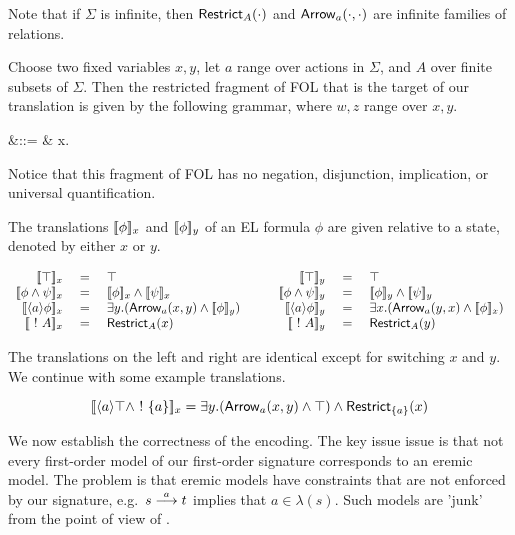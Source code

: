 \NI Note that if $\Sigma$ is infinite, then $\mathsf{Restrict}_{A}(\cdot)$ and
$\mathsf{Arrow}_{a}(\cdot, \cdot)$ are infinite families of relations.


 Choose two fixed variables $x, y$, let $a$ range over actions in
$\Sigma$, and $A$ over finite subsets of $\Sigma$. Then the restricted
fragment of FOL that is the target of our translation is given by the
following grammar, where $w, z$ range over $x, y$.

\begin{GRAMMAR}
  \phi 
     &\quad ::= \quad&
  \top \fOr {}\fOr {} \fOr \phi \AND \psi \fOr \exists x. \phi 
\end{GRAMMAR}

\NI Notice that this fragment of FOL has no negation, disjunction,
implication, or universal quantification. 

The translations $\lbrack\!\lbrack \phi \rbrack\!\rbrack_x$ and $\lbrack\!\lbrack \phi \rbrack\!\rbrack_y$ of an EL formula
$\phi$ are given relative to a state, denoted by either $x$ or $y$.

\[
\begin{array}{rclcrcl}
  \SEMB{\top}_x & \ = \ & \top  
     &\quad& 
  \SEMB{\top}_y & \ = \ & \top 
     \\
  \SEMB{\phi \AND \psi}_x & = & \SEMB{\phi}_x \AND \SEMB{\psi}_x  
     && 
  \SEMB{\phi \AND \psi}_y & = & \SEMB{\phi}_y \AND \SEMB{\psi}_y  
     \\
  \SEMB{\langle a \rangle \phi}_x & = & \exists y.(\ARROW{a}{x}{y} \AND \SEMB{\phi}_y)  
     &&
  \SEMB{\langle a \rangle \phi}_y & = & \exists x.(\ARROW{a}{y}{x} \AND \SEMB{\phi}_x)  
     \\
  \SEMB{\fBang A}_x & = & \RESTRICT{A}{x}
     &&
  \SEMB{\fBang A}_y & = & \RESTRICT{A}{y}
\end{array}
\]

\NI The translations on the left and right are identical except for
switching $x$ and $y$. We continue with some example translations.

\[
   \lbrack\!\lbrack \langle a \rangle \top \land \ ! \  \{a\} \rbrack\!\rbrack_x 
      = 
   \exists y.(\mathsf{Arrow}_{a}(x, y) \land \top ) \land \mathsf{Restrict}_{\{a\}}(x)
\]


\NI We now establish the correctness of the encoding. The key issue
issue is that not every first-order model of our first-order signature
corresponds to an eremic model. The problem is that eremic models have
constraints that are not enforced by our signature, e.g.~$s \stackrel{a}{\longrightarrow}
t$ implies that $a \in \lambda(s)$. Such models are 'junk' from the
point of view of \ELABR{}. 

